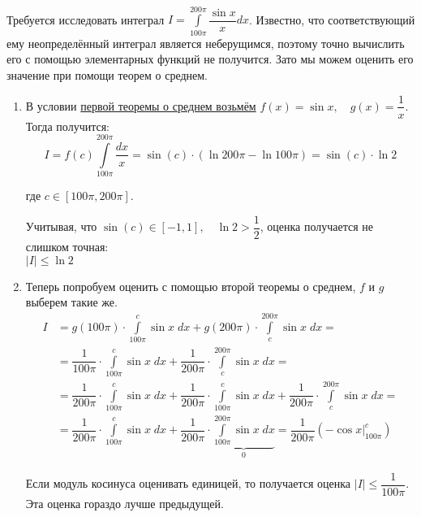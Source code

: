 \documentclass[../main.tex]{subfiles}
\begin{document}
\begin{example}
    
    ~

    Требуется исследовать интеграл \( I= \displaystyle\int\limits_{ 100 \pi }^{ 200 \pi } \dfrac{ \sin x}{ x} dx\). Известно, что соответствующий ему неопределённый интеграл является неберущимся, поэтому точно вычислить его с помощью элементарных функций не получится. Зато мы можем оценить его значение при помощи теорем о среднем. 

    \begin{enumerate}
        \item В условии \hyperlink{thm:first_average}{первой теоремы о среднем возьмём} \( f\left( x\right)=\sin x,\quad g \left( x\right) = \dfrac{ 1}{ x} \). Тогда получится:
        \[ I=f \left( c\right) \displaystyle\int\limits_{ 100 \pi }^{ 200 \pi } \dfrac{ dx}{ x} =\sin \left( c\right) \cdot \left( \ln 200 \pi - \ln 100 \pi \right)=\sin \left( c\right) \cdot \ln 2\]
        \par где \( c \in \left[ 100 \pi , 200 \pi \right]\). 
        \par Учитывая, что \( \sin \left( c\right) \in \left[ -1, 1\right],\quad \ln 2 > \dfrac{ 1}{ 2} \), оценка получается не слишком точная: \\
        \( \left| I\right| \leq \ln 2\)
        \item Теперь попробуем оценить с помощью второй теоремы о среднем, \( f\) и \( g\) выберем такие же. 
        \begin{equation*}
            \begin{aligned}
                I&=g \left( 100 \pi \right) \cdot \displaystyle\int\limits_{ 100 \pi }^{ c} \sin x\; dx + g \left( 200 \pi \right) \cdot  \displaystyle\int\limits_{ c}^{ 200 \pi } \sin x\;dx=\\ 
                &= \dfrac{ 1}{ 100 \pi } \cdot \displaystyle\int\limits_{ 100 \pi }^{ c} \sin x \; dx + \dfrac{ 1}{ 200 \pi } \cdot \displaystyle\int\limits_{ c}^{ 200 \pi } \sin x\;dx=\\
                &= \dfrac{ 1}{ 200 \pi } \cdot \displaystyle\int\limits_{ 100 \pi }^{ c} \sin x\; dx + \dfrac{ 1}{ 200 \pi } \cdot  \displaystyle\int\limits_{ 100 \pi }^{ c} \sin x\;dx + \dfrac{ 1}{ 200 \pi } \cdot \displaystyle\int\limits_{ c}^{ 200 \pi } \sin x\;dx=\\
                &= \dfrac{ 1}{ 200 \pi } \cdot \displaystyle\int\limits_{ 100 \pi }^{ c} \sin x\; dx + \dfrac{ 1}{ 200 \pi } \cdot \underbrace{\displaystyle\int\limits_{ 100 \pi }^{ 200 \pi } \sin x\; dx}_0= \dfrac{ 1}{ 200 \pi} \left( - \cos x\bigg|_{100\pi}^c\right)  
            \end{aligned}
        \end{equation*}
        \par Если модуль косинуса оценивать единицей, то получается оценка \( \left| I\right| \leq \dfrac{ 1}{ 100 \pi } \). Эта оценка гораздо лучше предыдущей. 
    \end{enumerate}
\end{example}
\end{document}
